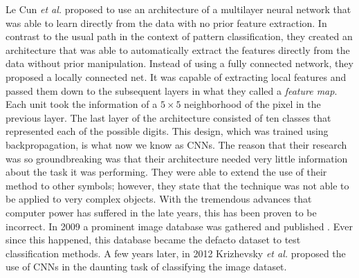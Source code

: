 Le Cun \textit{et al.} \cite{119325} proposed to use an architecture of a multilayer neural network that was able to learn directly from the data with no prior feature extraction. In contrast to the usual path in the context of pattern classification, they created an architecture that was able to automatically extract the features directly from the data without prior manipulation. Instead of using a fully connected network, they proposed a locally connected net. It was capable of extracting local features and passed them down to the subsequent layers in what they called a \textit{feature map}. Each unit took the information of a $5\times 5$ neighborhood of the pixel in the previous layer. The last layer of the architecture consisted of ten classes that represented each of the possible digits. This design, which was trained using backpropagation, is what now we know as CNNs. The reason that their research was so groundbreaking was that their architecture needed very little information about the task it was performing. They were able to extend the use of their method to other symbols; however, they state that the technique was not able to be applied to very complex objects. With the tremendous advances that computer power has suffered in the late years, this has been proven to be incorrect. In 2009 a prominent image database was gathered and published \cite{Deng09imagenet:a}. Ever since this happened, this database became the defacto dataset to test classification methods. A few years later, in 2012 Krizhevsky \textit{et al.} \cite{krizhevsky} proposed the use of CNNs in the daunting task of classifying the image dataset.\\

